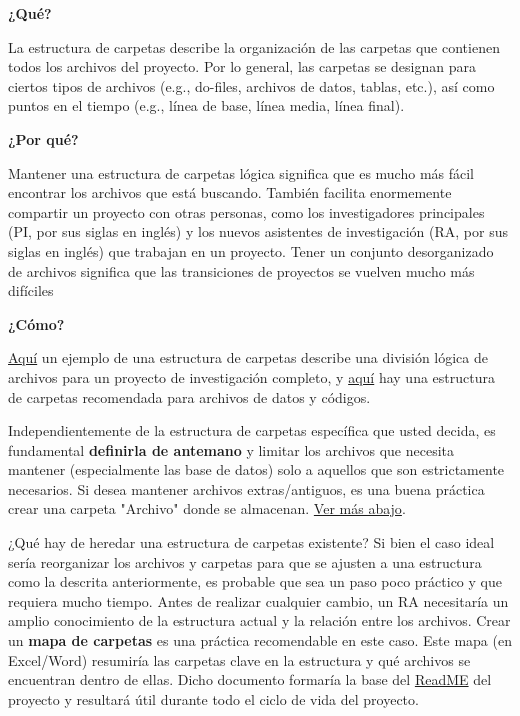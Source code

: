 \documentclass[11pt,en]{elegantpaper}
\begin{document}
\textbf{¿Qué?}

La estructura de carpetas describe la organización de las carpetas que contienen todos los archivos del proyecto. Por lo general, las carpetas se designan para ciertos tipos de archivos (e.g., do-files, archivos de datos, tablas, etc.), así como puntos en el tiempo (e.g., línea de base, línea media, línea final).

\textbf{¿Por qué?} 

Mantener una estructura de carpetas lógica significa que es mucho más fácil encontrar los archivos que está buscando. También facilita enormemente compartir un proyecto con otras personas, como los investigadores principales (PI, por sus siglas en inglés) y los nuevos asistentes de investigación (RA, por sus siglas en inglés) que trabajan en un proyecto. Tener un conjunto desorganizado de archivos significa que las transiciones de proyectos se vuelven mucho más difíciles


\textbf{¿Cómo?}

\hyperref[fig:carpetas]{Aquí} un ejemplo de una estructura de carpetas describe una división lógica de archivos para un proyecto de investigación completo, y \hyperref[fig:code]{aquí} hay una estructura de carpetas recomendada para archivos de datos y códigos. 

Independientemente de la estructura de carpetas específica que usted decida, es fundamental \textbf{definirla de antemano} y limitar los archivos que necesita mantener (especialmente las base de datos) solo a aquellos que son estrictamente necesarios. Si desea mantener archivos extras/antiguos, es una buena práctica crear una carpeta "Archivo" donde se almacenan. \hyperref[sec:doorganizar]{Ver más abajo}.

¿Qué hay de heredar una estructura de carpetas existente? Si bien el caso ideal sería reorganizar los archivos y carpetas para que se ajusten a una estructura como la descrita anteriormente, es probable que sea un paso poco práctico y que requiera mucho tiempo. Antes de realizar cualquier cambio, un RA necesitaría un amplio conocimiento de la estructura actual y la relación entre los archivos. Crear un \textbf{mapa de carpetas} es una práctica recomendable en este caso. Este mapa (en Excel/Word) resumiría las carpetas clave en la estructura y qué archivos se encuentran dentro de ellas. Dicho documento formaría la base del \href{http://www.poverty-action.org/research-transparency/example-readme-files}{ReadME} del proyecto y resultará útil durante todo el ciclo de vida del proyecto.
\end{document}
